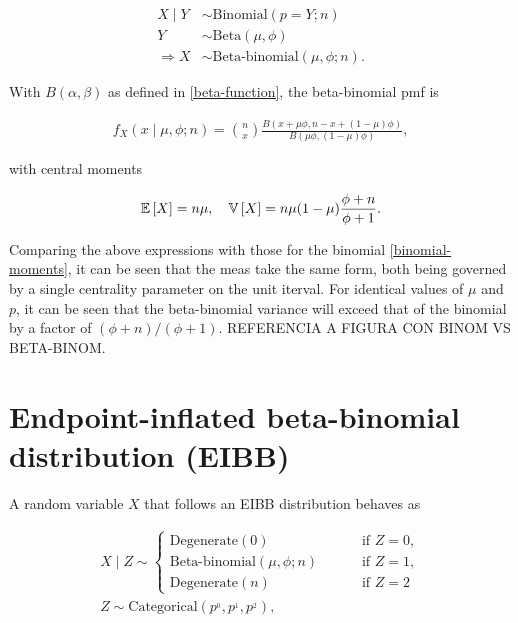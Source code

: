 \begin{equation}
\begin{split}
X \mid Y &\sim \text{Binomial}(p=Y; n)\\
Y &\sim \text{Beta}(\mu, \phi)\\
\Rightarrow X &\sim \text{Beta-binomial}(\mu, \phi; n).
\end{split}
\end{equation}

With $B(\alpha,\beta)$ as defined in \ref{beta-function}, the beta-binomial pmf is

\begin{equation}
\begin{split}
f_X(x \mid \mu, \phi; n) = \binom{n}{x}\frac{B(x+\mu\phi, n - x + (1-\mu)\phi)}{B(\mu\phi, (1-\mu)\phi)},
\end{split}
\label{betabinomial-pmf}
\end{equation}

with central moments

\begin{equation}
\begin{split}
{\mathbb E}\left[ X \right] = n\mu, \quad {\mathbb V}\left[ X \right] = n\mu(1-\mu)\frac{\phi+n}{\phi+1}.
\end{split}
\end{equation}

Comparing the above expressions with those for the binomial \ref{binomial-moments}, it can be seen that the meas take the same form, both being governed by a single centrality parameter on the unit iterval. For identical values of $\mu$ and $p$, it can be seen that the beta-binomial variance will exceed that of the binomial by a factor of $(\phi+n)/(\phi+1)$. REFERENCIA A FIGURA CON BINOM VS BETA-BINOM.

\section{Endpoint-inflated beta-binomial distribution (EIBB)}
\label{sec:eibb-dist}

A random variable $X$ that follows an EIBB distribution behaves as

\begin{equation}
\begin{split}
X \mid Z \sim
\begin{cases}
\text{Degenerate}(0) \qquad &\text{ if } Z=0,\\
\text{Beta-binomial}(\mu, \phi; n) \qquad &\text{ if } Z=1,\\
\text{Degenerate}(n) \qquad &\text{ if } Z=2
\end{cases}\\
Z \sim \text{Categorical}(p^{_0}, p^{_1}, p^{_2}),
\end{split}
\label{eibb-distribution}
\end{equation}

